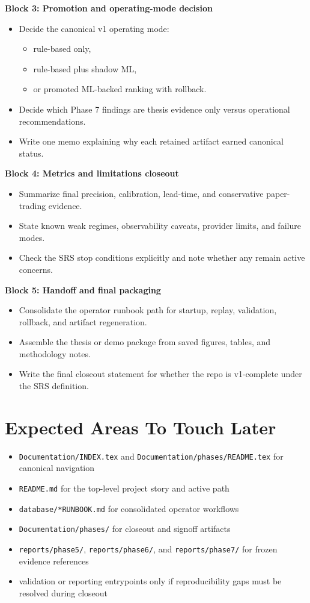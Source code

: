 \documentclass{article}
\begin{document}
\textbf{Block 3: Promotion and operating-mode decision}
\begin{itemize}
\item Decide the canonical v1 operating mode:
\begin{itemize}
\item rule-based only,
\item rule-based plus shadow ML,
\item or promoted ML-backed ranking with rollback.
\end{itemize}
\item Decide which Phase 7 findings are thesis evidence only versus operational recommendations.
\item Write one memo explaining why each retained artifact earned canonical status.
\end{itemize}

\textbf{Block 4: Metrics and limitations closeout}
\begin{itemize}
\item Summarize final precision, calibration, lead-time, and conservative paper-trading evidence.
\item State known weak regimes, observability caveats, provider limits, and failure modes.
\item Check the SRS stop conditions explicitly and note whether any remain active concerns.
\end{itemize}

\textbf{Block 5: Handoff and final packaging}
\begin{itemize}
\item Consolidate the operator runbook path for startup, replay, validation, rollback, and artifact regeneration.
\item Assemble the thesis or demo package from saved figures, tables, and methodology notes.
\item Write the final closeout statement for whether the repo is v1-complete under the SRS definition.
\end{itemize}

\section*{Expected Areas To Touch Later}
\begin{itemize}
\item \texttt{Documentation/INDEX.tex} and \texttt{Documentation/phases/README.tex} for canonical navigation
\item \texttt{README.md} for the top-level project story and active path
\item \texttt{database/*RUNBOOK.md} for consolidated operator workflows
\item \texttt{Documentation/phases/} for closeout and signoff artifacts
\item \texttt{reports/phase5/}, \texttt{reports/phase6/}, and \texttt{reports/phase7/} for frozen evidence references
\item validation or reporting entrypoints only if reproducibility gaps must be resolved during closeout
\end{itemize}
\end{document}

